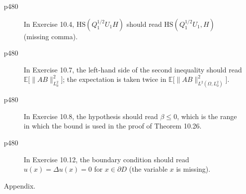 \documentclass[final]{article}
\theoremstyle{definition}
\begin{document}
\begin{enumerate}
\begin{description}
   \item[p480] In Exercise 10.4, $\mathrm{HS}(Q_1^{1/2}U_1H)$ should read
$\mathrm{HS}(Q_1^{1/2}U_1,H)$ (missing comma).
   \item[p480] In Exercise 10.7, the left-hand side of the second inequality should read
$\mathbb{E}\bigl[\|AB\|^2_{L^2_0}\bigr]$; the expectation is taken twice in
$\mathbb{E}\bigl[\|AB\|^2_{L^2(\Omega,L^2_0)}\bigr]$.
   \item[p480] In Exercise 10.8, the hypothesis should read $\beta\le0$, which is the range in which the bound is used in the proof of Theorem 10.26.
   \item[p480] In Exercise 10.12, the boundary condition should read
$u(x)=\Delta u(x)=0$ for $x\in\partial D$ (the variable $x$ is missing).
   \end{description}
 \item[Appendix.]\hphantom{\,}
 \end{enumerate}
\end{document}
